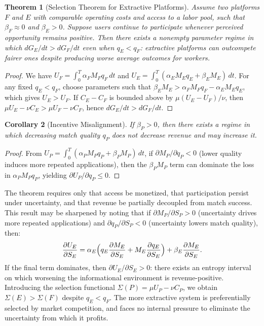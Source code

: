 \documentclass[11pt]{article}
\newtheorem{theorem}{Theorem}
\newtheorem{corollary}[theorem]{Corollary}
\begin{document}
\begin{theorem}[Selection Theorem for Extractive Platforms]
Assume two platforms $F$ and $E$ with comparable operating costs and
access to a labor pool, such that $\beta_F \approx 0$ and $\beta_E > 0$.
Suppose users continue to participate whenever perceived opportunity remains
positive. Then there exists a nonempty parameter regime in which
$dG_E/dt > dG_F/dt$ even when $q_E < q_F$: extractive platforms can
outcompete fairer ones despite producing worse average outcomes for workers.
\end{theorem}

\begin{proof}
We have $U_F = \int_0^T \alpha_F M_F q_F\,dt$ and
$U_E = \int_0^T (\alpha_E M_E q_E + \beta_E M_E)\,dt$.
For any fixed $q_E < q_F$, choose parameters such that
$\beta_E M_E > \alpha_F M_F q_F - \alpha_E M_E q_E$,
which gives $U_E > U_F$. If $C_E - C_F$ is bounded above by
$\mu(U_E - U_F)/\nu$, then $\mu U_E - \nu C_E > \mu U_F - \nu C_F$,
hence $dG_E/dt > dG_F/dt$.
\end{proof}


\begin{corollary}[Incentive Misalignment]
If $\beta_P > 0$, then there exists a regime in which decreasing match
quality $q_P$ does not decrease revenue and may increase it.
\end{corollary}

\begin{proof}
From $U_P = \int_0^T (\alpha_P M_P q_P + \beta_P M_P)\,dt$, if
$\partial M_P / \partial q_P < 0$ (lower quality induces more repeated
applications), then the $\beta_P M_P$ term can dominate the loss in
$\alpha_P M_P q_P$, yielding $\partial U_P / \partial q_P \leq 0$.
\end{proof}

The theorem requires only that access be monetized, that participation persist
under uncertainty, and that revenue be partially decoupled from match success.
This result may be sharpened by noting that if $\partial M_P/\partial S_P > 0$
(uncertainty drives more repeated applications) and $\partial q_P/\partial
S_P < 0$ (uncertainty lowers match quality), then:
\[
\frac{\partial U_E}{\partial S_E} = \alpha_E \Bigl( q_E
\frac{\partial M_E}{\partial S_E} + M_E \frac{\partial q_E}{\partial S_E}
\Bigr) + \beta_E \frac{\partial M_E}{\partial S_E}.
\]
If the final term dominates, then $\partial U_E/\partial S_E > 0$: there
exists an entropy interval on which worsening the informational environment
is revenue-positive. Introducing the selection functional
$\Sigma(P) = \mu U_P - \nu C_P$, we obtain $\Sigma(E) > \Sigma(F)$ despite
$q_E < q_F$. The more extractive system is preferentially selected by market
competition, and faces no internal pressure to eliminate the uncertainty from
which it profits.
\end{document}
